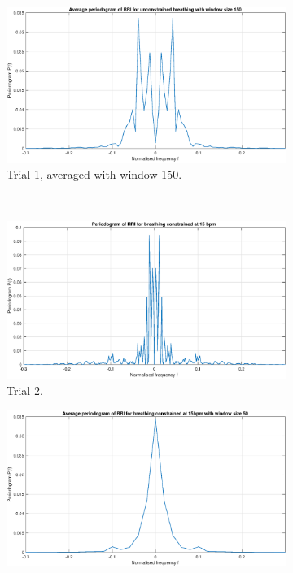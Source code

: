 \begin{figure}[H]
\begin{subfigure}{.32\textwidth}
  \centering
  \includegraphics[width=\linewidth]{assignment3figs/new_pgm_uncon_ave150.eps}  
  \caption{Trial 1, averaged with window 150.}
\end{subfigure}\\
\begin{subfigure}{.32\textwidth}
  \centering
  \includegraphics[width=\linewidth]{assignment3figs/new_pgm_con15_noave.eps}
  \caption{Trial 2.}
\end{subfigure}
\begin{subfigure}{.32\textwidth}
  \centering
  \includegraphics[width=\linewidth]{assignment3figs/new_pgm_con15_ave50.eps}  

\end{subfigure}
\end{figure}
